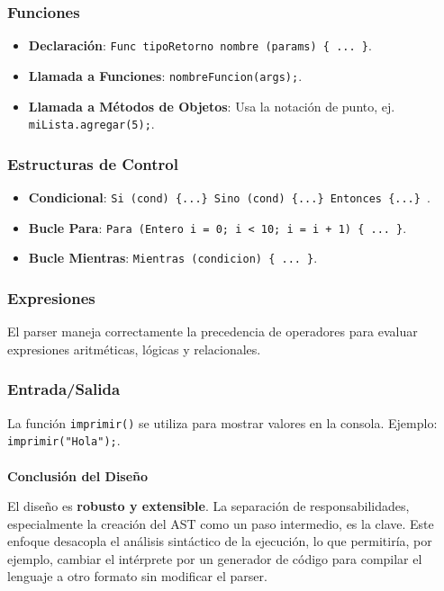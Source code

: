 \documentclass{article}
\begin{document}
\subsubsection{Funciones}
\begin{itemize}
    \item \textbf{Declaración}: \texttt{Func tipoRetorno nombre (params) \{ ... \}}.
    \item \textbf{Llamada a Funciones}: \texttt{nombreFuncion(args);}.
    \item \textbf{Llamada a Métodos de Objetos}: Usa la notación de punto, ej. \texttt{miLista.agregar(5);}.
\end{itemize}

\subsubsection{Estructuras de Control}
\begin{itemize}
    \item \textbf{Condicional}: \texttt{Si (cond) \{...\} Sino (cond) \{...\} Entonces \{...\} }.
    \item \textbf{Bucle Para}: \texttt{Para (Entero i = 0; i < 10; i = i + 1) \{ ... \}}.
    \item \textbf{Bucle Mientras}: \texttt{Mientras (condicion) \{ ... \}}.
\end{itemize}

\subsubsection{Expresiones}
El parser maneja correctamente la precedencia de operadores para evaluar expresiones aritméticas, lógicas y relacionales.

\subsubsection{Entrada/Salida}
La función \texttt{imprimir()} se utiliza para mostrar valores en la consola. Ejemplo: \texttt{imprimir("Hola");}.
\\\\

\textbf{Conclusión del Diseño}

El diseño es \textbf{robusto y extensible}. La separación de responsabilidades, especialmente la creación del AST como un paso intermedio, es la clave. Este enfoque desacopla el análisis sintáctico de la ejecución, lo que permitiría, por ejemplo, cambiar el intérprete por un generador de código para compilar el lenguaje a otro formato sin modificar el parser.
\end{document}

